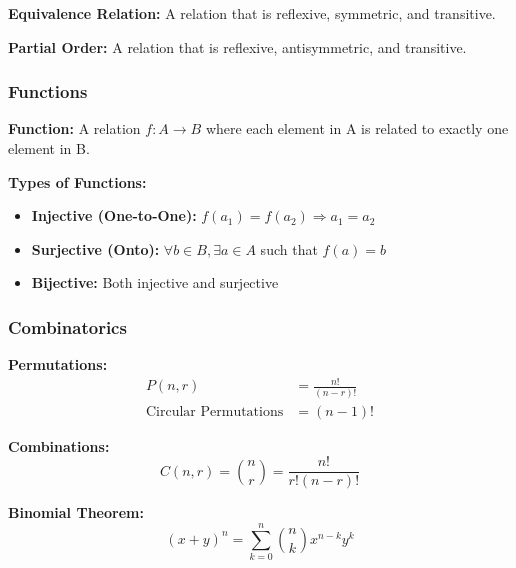 \documentclass[11pt,a4paper]{article}
\begin{document}
\begin{defbox}
\textbf{Equivalence Relation:} A relation that is reflexive, symmetric, and transitive.
\end{defbox}

\begin{defbox}
\textbf{Partial Order:} A relation that is reflexive, antisymmetric, and transitive.
\end{defbox}

\subsubsection{Functions}

\begin{defbox}
\textbf{Function:} A relation $f: A \rightarrow B$ where each element in A is related to exactly one element in B.
\end{defbox}

\textbf{Types of Functions:}
\begin{itemize}
    \item \textbf{Injective (One-to-One):} $f(a_1) = f(a_2) \Rightarrow a_1 = a_2$
    \item \textbf{Surjective (Onto):} $\forall b \in B, \exists a \in A$ such that $f(a) = b$
    \item \textbf{Bijective:} Both injective and surjective
\end{itemize}

\subsubsection{Combinatorics}

\begin{formulabox}
\textbf{Permutations:}
\begin{align*}
    P(n,r) &= \frac{n!}{(n-r)!} \\
    \text{Circular Permutations} &= (n-1)!
\end{align*}
\end{formulabox}

\begin{formulabox}
\textbf{Combinations:}
\[
    C(n,r) = \binom{n}{r} = \frac{n!}{r!(n-r)!}
\]
\end{formulabox}

\begin{formulabox}
\textbf{Binomial Theorem:}
\[
    (x+y)^n = \sum_{k=0}^{n} \binom{n}{k} x^{n-k} y^k
\]
\end{formulabox}
\end{document}
